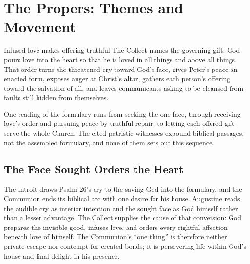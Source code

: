 \section*{The Propers: Themes and Movement}

\begin{massbox}{Infused love makes offering truthful}
The Collect names the governing gift: God pours love into the heart so that he is loved in all things and above all things. That order turns the threatened cry toward God's face, gives Peter's peace an enacted form, exposes anger at Christ's altar, gathers each person's offering toward the salvation of all, and leaves communicants asking to be cleansed from faults still hidden from themselves.
\end{massbox}

\begin{center}
\end{center}

\noindent One reading of the formulary runs from seeking the one face, through receiving love's order and pursuing peace by truthful repair, to letting each offered gift serve the whole Church. The cited patristic witnesses expound biblical passages, not the assembled formulary, and none of them sets out this sequence.

\sectionguard
\subsection*{The Face Sought Orders the Heart\enspace{}}

The Introit draws Psalm 26's cry to the saving God into the formulary, and the Communion ends its biblical arc with one desire for his house. Augustine reads the audible cry as interior intention and the sought face as God himself rather than a lesser advantage. The Collect supplies the cause of that conversion: God prepares the invisible good, infuses love, and orders every rightful affection beneath love of himself. The Communion's ``one thing'' is therefore neither private escape nor contempt for created bonds; it is persevering life within God's house and final delight in his presence.

